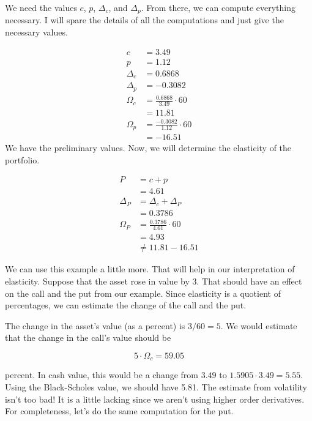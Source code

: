 \documentclass{ximera}
\begin{document}
\begin{solution}
We need the values $c$, $p$, $\Delta_c$, and $\Delta_p$. From there, we can compute everything necessary. I will spare the details of all the computations and just give the necessary values.

	\begin{align*}
	c 		&=3.49\\
	p 		&=1.12\\
	\Delta_c 	&=0.6868\\
	\Delta_p 	&=-0.3082\\
	\Omega_c 	&=\frac{0.6868}{3.49}\cdot 60\\
			&=11.81\\
	\Omega_p 	&=\frac{-0.3082}{1.12}\cdot 60\\
			&=-16.51
	\end{align*}
We have the preliminary values. Now, we will determine the elasticity of the portfolio.

	\begin{align*}
	P 		&=c+p\\
			&=4.61\\
	\Delta_P 	&=\Delta_c+\Delta_P\\
			&=0.3786\\
	\Omega_P 	&=\frac{0.3786}{4.61}\cdot 60\\
			&=4.93\\
			&\not=11.81-16.51
	\end{align*}
\end{solution}

We can use this example a little more. That will help in our interpretation of elasticity. Suppose that the asset rose in value by $3$. That should have an effect on the call and the put from our example. Since elasticity is a quotient of percentages, we can estimate the change of the call and the put.

The change in the asset's value (as a percent) is $3/60=5$. We would estimate that the change in the call's value should be

\begin{equation*}
5\cdot \Omega_c 	=59.05
\end{equation*}
 
percent. In cash value, this would be a change from $3.49$ to $1.5905\cdot 3.49=5.55$. Using the Black-Scholes value, we should have 5.81. The estimate from volatility isn't too bad! It is a little lacking since we aren't using higher order derivatives. For completeness, let's do the same computation for the put.
\end{document}
